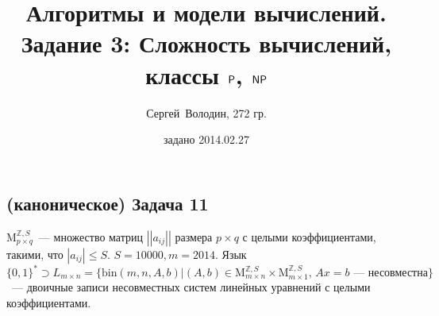 \documentclass[a4paper]{article}
\date{задано 2014.02.27}
\author{Сергей~Володин, 272 гр.}
\title{Алгоритмы и модели вычислений.\\Задание 3: Сложность вычислений, классы ${\mathsf{P}}$, ${\mathsf{NP}}$}
\newcommand{\matrixl}{\left|\left|}
\newcommand{\matrixr}{\right|\right|}
\begin{document}
\maketitle
\subsection*{(каноническое) Задача 11}
$\mbox{M}^{\mathbb{Z}, S}_{p\times q}$~--- множество матриц $\matrixl a_{ij} \matrixr$ размера $p\times q$ с целыми коэффициентами, такими, что $|a_{ij}|\leqslant S$. $S=10000, m=2014$. Язык $\{0,1\}^*\supset L_{m\times n}=\{\mbox{bin}(m,n,A,b)\big|(A,b)\in\mbox{M}^{\mathbb{Z}, S}_{m\times n}\times \mbox{M}^{\mathbb{Z}, S}_{m\times 1},\,Ax=b\mbox{~--- несовместна}\}$~--- двоичные записи несовместных систем линейных уравнений с целыми коэффициентами.
\end{document}
